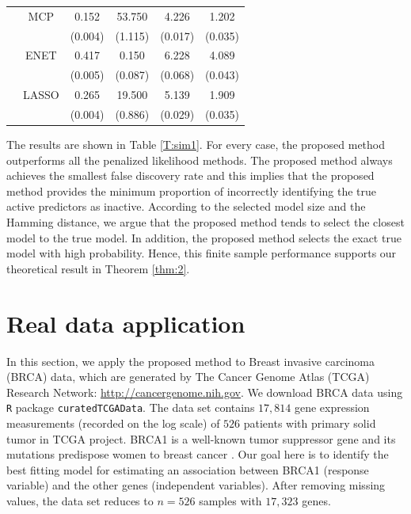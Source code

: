 \begin{table}[h]
\begin{tabular}{c|ccccc}
           & MCP                            & 0.152 & 53.750 & 4.226 & 1.202 \\
           &                           & (0.004)  & (1.115)  & (0.017)   & (0.035) \\
           & ENET                           & 0.417 & 0.150& 6.228& 4.089 \\
           &                           & (0.005)  & (0.087)   & (0.068)   & (0.043) \\
           & LASSO                          & 0.265& 19.500 & 5.139 & 1.909 \\
           &                          & (0.004)  &(0.886)  &(0.029)   & (0.035) \\
\hline
\end{tabular}
\end{table}

The results are shown in Table \ref{T:sim1}. For every case, the proposed method outperforms all the penalized likelihood methods. The proposed method always achieves the smallest false discovery rate and this implies that the proposed method provides the minimum proportion of incorrectly identifying the true active predictors as inactive. According to the selected model size and the Hamming distance, we argue that the proposed method tends to select the closest model to the true model. In addition, the proposed method selects the exact true model with high probability. Hence, this finite sample performance supports our theoretical result in Theorem \ref{thm:2}.


\section{Real data application}
In this section, we apply the proposed method to Breast invasive carcinoma (BRCA) data, which are generated by The Cancer Genome Atlas (TCGA) Research Network: \url{http://cancergenome.nih.gov}. We download BRCA data using \texttt{R} package \texttt{curatedTCGAData}. The data set contains $17,814$ gene expression measurements (recorded on the log scale) of $526$ patients with primary solid tumor in TCGA project. BRCA1 is a well-known tumor suppressor gene and its mutations predispose women to breast cancer \citep{findlay2018accurate}. Our goal here is to identify the best fitting model for estimating an association between BRCA1 (response variable) and the other genes (independent variables). After removing missing values, the data set reduces to $n=526$ samples with $17,323$ genes.

